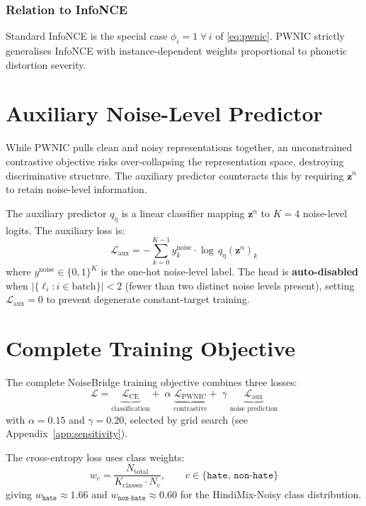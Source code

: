 \documentclass[12pt,a4paper]{report}
\newcommand{\PWNIC}{\mathcal{L}_{\mathrm{PWNIC}}}
\newcommand{\LCE}{\mathcal{L}_{\mathrm{CE}}}
\newcommand{\Laux}{\mathcal{L}_{\mathrm{aux}}}
\newcommand{\Ltot}{\mathcal{L}}
\begin{document}
\subsubsection{Relation to InfoNCE}
Standard InfoNCE \cite{oord2018representation} is the special case $\phi_i = 1\;\forall\,i$ of \eqref{eq:pwnic}. PWNIC strictly generalises InfoNCE with instance-dependent weights proportional to phonetic distortion severity.

\section{Auxiliary Noise-Level Predictor}
\label{sec:aux}

While PWNIC pulls clean and noisy representations together, an unconstrained contrastive objective risks over-collapsing the representation space, destroying discriminative structure. The auxiliary predictor counteracts this by requiring $\mathbf{z}^n$ to retain noise-level information.

The auxiliary predictor $q_\eta$ is a linear classifier mapping $\mathbf{z}^n$ to $K = 4$ noise-level logits. The auxiliary loss is:
\begin{equation}
  \Laux = -\sum_{k=0}^{K-1} y_k^{\text{noise}} \cdot \log\, q_\eta(\mathbf{z}^n)_k
  \label{eq:aux}
\end{equation}
where $y^{\text{noise}} \in \{0,1\}^K$ is the one-hot noise-level label. The head is \textbf{auto-disabled} when $|\{\ell_i : i \in \text{batch}\}| < 2$ (fewer than two distinct noise levels present), setting $\Laux = 0$ to prevent degenerate constant-target training.

\section{Complete Training Objective}
\label{sec:objective}

The complete NoiseBridge training objective combines three losses:
\begin{equation}
  \boxed{
  \Ltot = \underbrace{\LCE}_{\text{classification}}
        + \;\alpha\;\underbrace{\PWNIC}_{\text{contrastive}}
        + \;\gamma\;\underbrace{\Laux}_{\text{noise prediction}}
  }
  \label{eq:total_loss}
\end{equation}
with $\alpha = 0.15$ and $\gamma = 0.20$, selected by grid search (see Appendix~\ref{app:sensitivity}).

The cross-entropy loss uses class weights:
\begin{equation}
  w_c = \frac{N_{\text{total}}}{K_{\text{classes}} \cdot N_c}, \qquad c \in \{\texttt{hate},\, \texttt{non-hate}\}
  \label{eq:class_weights}
\end{equation}
giving $w_{\texttt{hate}} \approx 1.66$ and $w_{\texttt{non-hate}} \approx 0.60$ for the HindiMix-Noisy class distribution.
\end{document}
